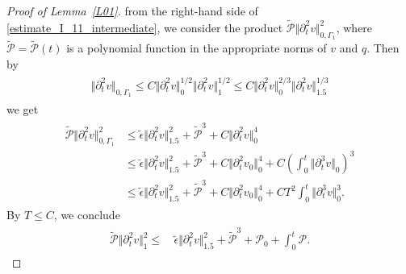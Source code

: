 \documentclass[10pt,reqno]{amsart}
\theoremstyle{plain}
\theoremstyle{definition}
\numberwithin{equation}{section}
\newcommand{\ccP}{\mathscr{P}}
\newcommand{\ccPz}{\mathscr{P}_0}
\newcommand{\Ga}{\Gamma}
\newcommand{\norm}[1]{\Vert#1\Vert}
\def\cPt{{\tilde{\mathcal P}}}
\def\fractext#1#2{{#1}/{#2}}
\begin{document}
\begin{proof}[Proof of Lemma~\ref{L01}]
from the right-hand side of \eqref{estimate_I_11_intermediate},
we consider the product
$
\cPt \norm{\partial^2_t v}_{0,\Ga_1}^2$,
where $\cPt = \cPt(t)$ is a polynomial function
in the appropriate norms of $v$ and $q$. Then
by
  \begin{align}
   \begin{split}
      \norm{\partial^2_t v}_{0,\Ga_1}
      \le
      C
      \norm{ \partial^2_t v}_{0}^{1/2}
      \norm{ \partial^2_t v}_{1}^{1/2}
      \leq 
        C 
        \norm{ \partial^2_t v}^{\fractext{2}{3}}_0
        \norm{ \partial^2_t v}^{\fractext{1}{3}}_{1.5}
   \end{split}
   \label{EQ02}
  \end{align}
we get
   \begin{align}
   \begin{split}
     \cPt \norm{ \partial^2_t v}_{0,\Gamma_1}^2 
    &\leq 
     \widetilde{\epsilon} \norm{\partial^2_t v}^2_{1.5} 
      + \cPt^{3} 
      + C  \norm{\partial^2_t v}^4_0
    \\&
    \leq
     \widetilde{\epsilon} \norm{\partial^2_t v}^2_{1.5} 
      + \cPt^{3} 
      + C  \norm{\partial^2_t v_0}^4_0
      + C 
        \left(
          \int_{0}^{t}
           \norm{\partial^3_t v}_0
        \right)^{3}
    \\&
    \leq
     \widetilde{\epsilon} \norm{\partial^2_t v}^2_{1.5} 
      + \cPt^{3} 
      + C  \norm{\partial^2_t v_0}^4_0
      + C T^{2}
          \int_{0}^{t}
           \norm{\partial^3_t v}_0^{3}
   .
   \end{split}
   \nonumber
   \end{align}
By $T\le C$, we conclude
\begin{align}
\begin{split}
\cPt \norm{ \partial^2_t v}_{1}^2 \leq   & \,
\widetilde{\epsilon} \norm{\partial^2_t v}_{1.5}^2 
+ \cPt^3 
+\ccPz
+ \int_0^t \ccP.
\end{split}
\label{estimate_partial_2_t_v_lower_order}
\end{align}

\end{proof}
\end{document}
